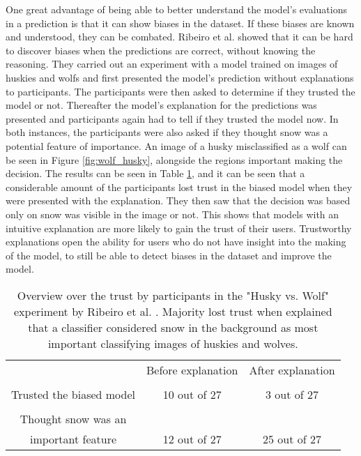 


One great advantage of being able to better understand the model's evaluations in a prediction is that it can show biases in the dataset. If these biases are known and understood, they can be combated. Ribeiro et al. \cite{ribeiroWhyShouldTrust2016} showed that it can be hard to discover biases when the predictions are correct, without knowing the reasoning. They carried out an experiment with a model trained on images of huskies and wolfs and first presented the model's prediction without explanations to participants. The participants were then asked to determine if they trusted the model or not. Thereafter the model's explanation for the predictions was presented and participants again had to tell if they trusted the model now. In both instances, the participants were also asked if they thought snow was a potential feature of importance. An image of a husky misclassified as a wolf can be seen in Figure \ref{fig:wolf_husky}, alongside the regions important making the decision. The results can be seen in Table \ref{table:husky_vs_wolf}, and it can be seen that a considerable amount of the participants lost trust in the biased model when they were presented with the explanation. They then saw that the decision was based only on snow was visible in the image or not. This shows that models with an intuitive explanation are more likely to gain the trust of their users. Trustworthy explanations open the ability for users who do not have insight into the making of the model, to still be able to detect biases in the dataset and improve the model. 

\begin{table}[htb]
    \centering
    \begin{tabular}{ c c c} 
     
               & Before explanation & After explanation\\ [0.5ex] 
        \Xhline{1.5pt} \\ 
            Trusted the biased model & 10 out of 27 & 3 out of 27 \\  [0.5ex]
        \hline  \\ 
            Thought snow was an \\ important feature & 12 out of 27 & 25 out of 27 \\ [1ex] 
        \hline
    \end{tabular}
    \caption[Overview over the trust by participants in the "Husky vs. Wolf" experiment by Ribeiro et al. \cite{ribeiroWhyShouldTrust2016}.]{Overview over the trust by participants in the "Husky vs. Wolf" experiment by Ribeiro et al. \cite{ribeiroWhyShouldTrust2016}. Majority lost trust when explained that a classifier considered snow in the background as most important classifying images of huskies and  wolves.}
    \label{table:husky_vs_wolf}
\end{table}

